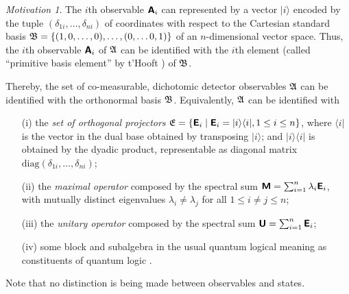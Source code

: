 \documentclass[%
  preprint,
 showpacs,
 showkeys,
 preprintnumbers,
 amsmath,amssymb,
 aps,
 prl,
  longbibliography,
 ]{revtex4-1}
\theoremstyle{definition}
\theoremstyle{remark}
\newtheorem*{motivation}{Motivation}
\begin{document}
\begin{motivation}
The $i$th observable $\textsf{\textbf{A}}_i$
can represented by a vector $\vert i \rangle$ \cite{mermin-07}
encoded by the tuple
$\left(\delta_{1i},  \ldots , \delta_{ni} \right)$
of coordinates with respect to the Cartesian standard basis
${\frak B} = \left\{(1,0,\ldots ,0),\ldots , (0,\ldots 0,1)\right\}$
of an $n$-dimensional vector space.
Thus, the $i$th observable $\textsf{\textbf{A}}_i$ of ${\frak A}$
can be identified with the $i$th element
(called ``primitive basis element'' by t'Hooft \cite{tHooft1990471})
of ${\frak B}$.


Thereby, the set of co-measurable, dichotomic detector observables
${\frak A}$
can be identified with the orthonormal basis
${\frak B}$.
Equivalently,
${\frak A}$ can be identified with
\begin{itemize}
\item[(i)]
the {\em set of orthogonal projectors} ${\frak E}
=\left\{ \textsf{\textbf{E}}_i \mid \textsf{\textbf{E}}_i   =\vert i \rangle \langle i \vert ,
1\le i \le n
\right\}$,
where $\langle i \vert$ is the vector in the dual base obtained by transposing  $\vert i \rangle$;
and $\vert i \rangle \langle i \vert$ is obtained by the dyadic product, representable as
diagonal matrix $\textrm{diag} \left(\delta_{1i},  \ldots , \delta_{ni} \right)$;
\item[(ii)]
the {\em maximal operator} composed by the spectral sum
$\textsf{\textbf{M}}=\sum_{i=1}^n \lambda_i \textsf{\textbf{E}}_i$,
with mutually distinct eigenvalues $\lambda_i \neq \lambda_j$ for all $1\le i\neq j \le n$;
\item[(iii)]
the {\em unitary operator} composed by the spectral sum \cite{Schwinger.60}
$\textsf{\textbf{U}}=\sum_{i=1}^n \textsf{\textbf{E}}_i$;
\item[(iv)]
some block and subalgebra in the usual quantum logical meaning
as constituents of quantum logic \cite{harding-navara-subalgebras}.
\end{itemize}

Note that no distinction is being made between observables and states.
\end{motivation}
\end{document}
